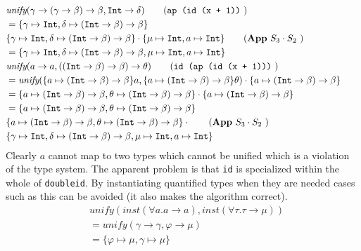 \documentclass[11pt,oneside,a4paper]{report}
\begin{document}
\begin{exmp}
\begin{align}
    &\textit{unify}(\gamma \rightarrow (\gamma \rightarrow \beta) \rightarrow \beta, \texttt{Int} \rightarrow \delta) \tag{\texttt{ap (id (x + 1))} }\\
    & = \{ \gamma \mapsto \texttt{Int}, \delta \mapsto (\texttt{Int} \rightarrow \beta) \rightarrow \beta \} \tag*{}\\
    &\{ \gamma \mapsto \texttt{Int}, \delta \mapsto (\texttt{Int} \rightarrow \beta) \rightarrow \beta \} \cdot \{ \mu \mapsto \texttt{Int}, a \mapsto \texttt{Int} \} \tag{\textbf{App} $S_3 \cdot S_2$ }\\
    & = \{ \gamma \mapsto \texttt{Int}, \delta \mapsto (\texttt{Int} \rightarrow \beta) \rightarrow \beta, \mu \mapsto \texttt{Int}, a \mapsto \texttt{Int} \} \tag*{}\\
    &\textit{unify}(a \rightarrow a, ((\texttt{Int} \rightarrow \beta) \rightarrow \beta) \rightarrow \theta) \tag{\texttt{id (ap (id (x + 1)))} }\\
    &= \textit{unify}(
     \{ a \mapsto  (\texttt{Int} \rightarrow \beta) \rightarrow \beta \} a,
     \{ a \mapsto  (\texttt{Int} \rightarrow \beta) \rightarrow \beta\} \theta
    ) \cdot \{ a \mapsto  (\texttt{Int} \rightarrow \beta) \rightarrow \beta\} \tag*{}\\
    &= \{ a \mapsto (\texttt{Int} \rightarrow \beta) \rightarrow \beta, \theta \mapsto (\texttt{Int} \rightarrow \beta) \rightarrow \beta \} \cdot \{ a \mapsto (\texttt{Int} \rightarrow \beta) \rightarrow \beta\} \tag*{}\\
    &= \{ a \mapsto (\texttt{Int} \rightarrow \beta) \rightarrow \beta, \theta \mapsto (\texttt{Int} \rightarrow \beta) \rightarrow \beta \} \tag*{}\\
    &\{ a \mapsto (\texttt{Int} \rightarrow \beta) \rightarrow \beta, \theta \mapsto (\texttt{Int} \rightarrow \beta) \rightarrow \beta \} \cdot \tag{\textbf{App} $S_3 \cdot S_2$ }\\
    &\{ \gamma \mapsto \texttt{Int}, \delta \mapsto (\texttt{Int} \rightarrow \beta) \rightarrow \beta, \mu \mapsto \texttt{Int}, a \mapsto \texttt{Int} \} \tag*{}
\end{align}
    Clearly $a$ cannot map to two types which cannot be unified which is a violation of the type system.
    The apparent problem is that \texttt{id} is specialized within the whole of \texttt{doubleid}.
    By instantiating quantified types when they are needed cases such as this can be avoided (it also makes the algorithm correct).
    \begin{align}
        &\textit{unify}(\textit{inst}(\forall a . a \rightarrow a), \textit{inst}(\forall \tau . \tau \rightarrow \mu))\\
        & = \textit{unify}(\gamma \rightarrow \gamma, \varphi \rightarrow \mu) \tag*{}\\
        & = \{ \varphi \mapsto \mu, \gamma \mapsto \mu \} \tag*{}
    \end{align}
\end{exmp}
\end{document}
